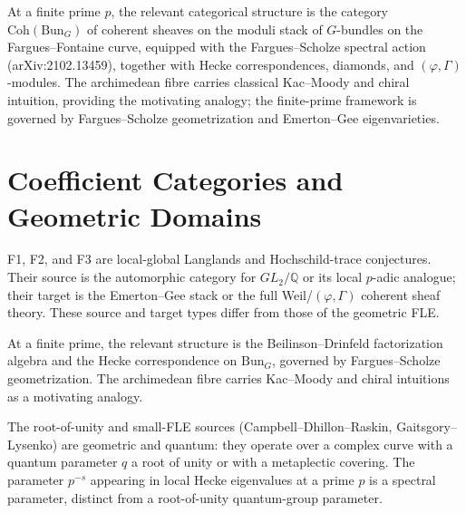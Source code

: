 \begin{remark}
\label{v4-arith:fle-comparison:rem:finite-prime-replacement}
At a finite prime \(p\), the relevant categorical structure is the
category \(\mathrm{Coh}(\mathrm{Bun}_{G})\) of coherent sheaves on
the moduli stack of \(G\)-bundles on the Fargues--Fontaine curve,
equipped with the Fargues--Scholze spectral action
(arXiv:2102.13459), together with Hecke correspondences, diamonds,
and \((\varphi,\Gamma)\)-modules.
The archimedean fibre carries classical Kac--Moody and chiral
intuition, providing the motivating analogy; the finite-prime
framework is governed by Fargues--Scholze geometrization and
Emerton--Gee eigenvarieties.
\end{remark}

\section{Coefficient Categories and Geometric Domains}
\label{v4-arith:fle-comparison:table}

\begin{remark}
\label{v4-arith:fle-comparison:rem:local-global-type}
F1, F2, and F3 are local-global Langlands and Hochschild-trace
conjectures. Their source is the automorphic category for
\(GL_{2}/\mathbb{Q}\) or its local \(p\)-adic analogue; their target
is the Emerton--Gee stack or the full Weil/\((\varphi,\Gamma)\)
coherent sheaf theory. These source and target types differ from those
of the geometric FLE.
\end{remark}

\begin{remark}
\label{v4-arith:fle-comparison:rem:chiral-at-finite-prime}
At a finite prime, the relevant structure is the
Beilinson--Drinfeld factorization algebra and the Hecke
correspondence on \(\mathrm{Bun}_{G}\), governed by Fargues--Scholze
geometrization. The archimedean fibre carries Kac--Moody and chiral
intuitions as a motivating analogy.
\end{remark}

\begin{remark}
\label{v4-arith:fle-comparison:rem:qgroup-domain}
The root-of-unity and small-FLE sources (Campbell--Dhillon--Raskin,
Gaitsgory--Lysenko) are geometric and quantum: they operate over a
complex curve with a quantum parameter \(q\) a root of unity or with
a metaplectic covering. The parameter \(p^{-s}\) appearing in local
Hecke eigenvalues at a prime \(p\) is a spectral parameter, distinct
from a root-of-unity quantum-group parameter.
\end{remark}

